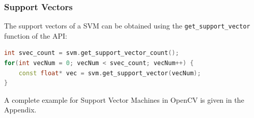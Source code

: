 \subsubsection*{Support Vectors}
The support vectors of a SVM can be obtained using the \lstinline|get_support_vector| function of the API:
\begin{lstlisting}[language=C++]
int svec_count = svm.get_support_vector_count();
for(int vecNum = 0; vecNum < svec_count; vecNum++) {
	const float* vec = svm.get_support_vector(vecNum);
}
\end{lstlisting}


A complete example for Support Vector Machines in OpenCV is given in the Appendix.
